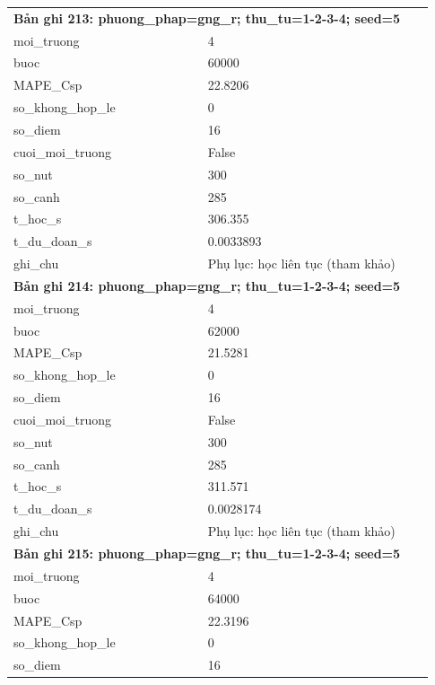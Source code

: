 \begin{longtable}{p{0.43\linewidth}p{0.50\linewidth}}
\midrule
\multicolumn{2}{p{0.95\linewidth}}{\textbf{Bản ghi 213: phuong\_phap=gng\_r; thu\_tu=1-2-3-4; seed=5}} \\
moi\_\allowbreak truong & 4 \\
buoc & 60000 \\
MAPE\_\allowbreak Csp & 22.8206 \\
so\_\allowbreak khong\_\allowbreak hop\_\allowbreak le & 0 \\
so\_\allowbreak diem & 16 \\
cuoi\_\allowbreak moi\_\allowbreak truong & False \\
so\_\allowbreak nut & 300 \\
so\_\allowbreak canh & 285 \\
t\_\allowbreak hoc\_\allowbreak s & 306.355 \\
t\_\allowbreak du\_\allowbreak doan\_\allowbreak s & 0.0033893 \\
ghi\_\allowbreak chu & Phụ lục: học liên tục (tham khảo) \\
\midrule
\multicolumn{2}{p{0.95\linewidth}}{\textbf{Bản ghi 214: phuong\_phap=gng\_r; thu\_tu=1-2-3-4; seed=5}} \\
moi\_\allowbreak truong & 4 \\
buoc & 62000 \\
MAPE\_\allowbreak Csp & 21.5281 \\
so\_\allowbreak khong\_\allowbreak hop\_\allowbreak le & 0 \\
so\_\allowbreak diem & 16 \\
cuoi\_\allowbreak moi\_\allowbreak truong & False \\
so\_\allowbreak nut & 300 \\
so\_\allowbreak canh & 285 \\
t\_\allowbreak hoc\_\allowbreak s & 311.571 \\
t\_\allowbreak du\_\allowbreak doan\_\allowbreak s & 0.0028174 \\
ghi\_\allowbreak chu & Phụ lục: học liên tục (tham khảo) \\
\midrule
\multicolumn{2}{p{0.95\linewidth}}{\textbf{Bản ghi 215: phuong\_phap=gng\_r; thu\_tu=1-2-3-4; seed=5}} \\
moi\_\allowbreak truong & 4 \\
buoc & 64000 \\
MAPE\_\allowbreak Csp & 22.3196 \\
so\_\allowbreak khong\_\allowbreak hop\_\allowbreak le & 0 \\
so\_\allowbreak diem & 16 \\

\end{longtable}
